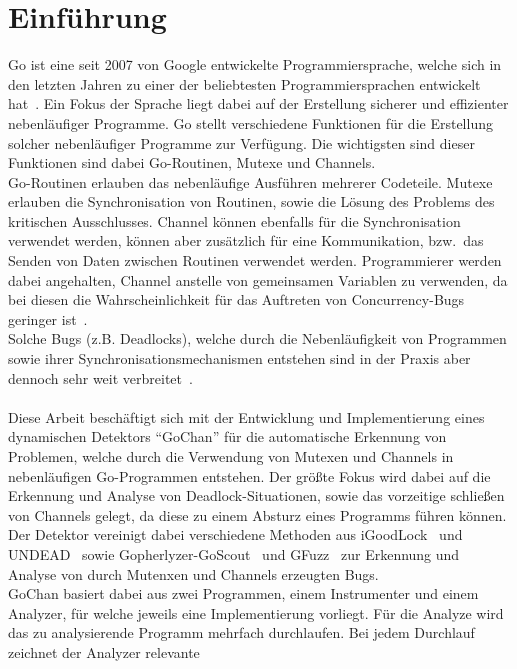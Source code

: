\chapter{Einführung}\label{chap:introduction}
Go ist eine seit 2007 von Google entwickelte Programmiersprache, welche sich 
in den letzten Jahren zu einer der beliebtesten Programmiersprachen entwickelt 
hat~\cite{ranking}. Ein Fokus der Sprache liegt dabei auf der Erstellung
sicherer und effizienter nebenläufiger Programme. Go stellt verschiedene 
Funktionen für die Erstellung solcher nebenläufiger Programme zur Verfügung.
Die wichtigsten sind dieser Funktionen sind dabei Go-Routinen, Mutexe und 
Channels.\\Go-Routinen erlauben das nebenläufige Ausführen mehrerer Codeteile.
Mutexe erlauben die Synchronisation von Routinen, sowie die Lösung des Problems 
des kritischen Ausschlusses. 
Channel können ebenfalls für die Synchronisation verwendet werden,
können aber zusätzlich für eine Kommunikation, bzw.\ das Senden von Daten zwischen 
Routinen verwendet werden. Programmierer werden dabei angehalten, Channel
anstelle von gemeinsamen Variablen zu verwenden, da bei diesen die Wahrscheinlichkeit
für das Auftreten von Concurrency-Bugs geringer ist~\cite{sharedMemory}.\\
Solche Bugs (z.B. Deadlocks), welche durch die Nebenläufigkeit von Programmen sowie ihrer 
Synchronisationsmechanismen entstehen sind in der Praxis aber dennoch sehr weit 
verbreitet~\cite{numberBugs}.\\\\
Diese Arbeit beschäftigt sich mit der Entwicklung und Implementierung
eines dynamischen Detektors ``GoChan'' für die automatische Erkennung
von Problemen, welche durch die Verwendung von Mutexen und Channels 
in nebenläufigen Go-Programmen entstehen. Der größte Fokus wird dabei 
auf die Erkennung und Analyse von Deadlock-Situationen, sowie das vorzeitige 
schließen von Channels gelegt, da diese zu einem Absturz eines Programms 
führen können. Der Detektor vereinigt dabei verschiedene Methoden aus 
iGoodLock~\cite{iGoodLock} und UNDEAD~\cite{Undead} sowie 
Gopherlyzer-GoScout~\cite{PPDP18} und GFuzz~\cite{gfuzz} zur 
Erkennung und Analyse von 
durch Mutenxen und Channels erzeugten Bugs.\\
GoChan basiert dabei aus zwei Programmen, einem Instrumenter und einem 
Analyzer, für welche jeweils eine 
Implementierung vorliegt. Für die Analyze wird das zu analysierende Programm 
mehrfach durchlaufen. Bei jedem Durchlauf zeichnet der Analyzer relevante 
